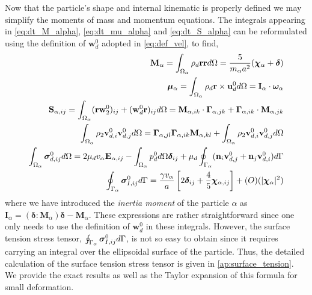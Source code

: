 Now that the particle's shape and internal kinematic is properly defined we may simplify the moments of mass and momentum equations. 
The integrals appearing in \ref{eq:dt_M_alpha}, \ref{eq:dt_mu_alpha} and \ref{eq:dt_S_alpha} can be reformulated using the definition of $\textbf{w}_d^0$ adopted in \ref{eq:def_vel}, to find, 
\begin{align}
    \textbf{M}_\alpha 
    = \intO{ \rho_d \textbf{rr} }
    = \frac{5}{m_\alpha a^2} (\bm\chi_\alpha+\bm\delta)\\
    \bm\mu_\alpha 
    = \intO{ \rho_d \textbf{r}\times\textbf{u}_d^0 }
    = \textbf{I}_\alpha \cdot \bm\omega_\alpha\\
    \textbf{S}_{\alpha,ij} = \intO{(\textbf{rw}_ 2^0 )_{ij}+ (\textbf{w}_d^0 \textbf{r})_{ij}} 
    = \textbf{M}_{\alpha,ik} \cdot \bm\Gamma_{\alpha,jk}
        +  \bm\Gamma_{\alpha,ik} \cdot \textbf{M}_{\alpha,jk}
    \\
    \intO{\rho_2 \textbf{v}_{d,i}^0\textbf{v}_{d,j}^0}
    = \bm\Gamma_{\alpha,jl}\bm\Gamma_{\alpha,ik} \textbf{M}_{\alpha,kl}  
    +\intO{\rho_2 \textbf{v}_{d,i}^0\textbf{v}_{d,j}^0}
    \label{eq:ww_def}
    \\
    \label{eq:sigma_d_def}
    \intO{\bm\sigma_{d,ij}^0}
    =
    2 \mu_d v_\alpha \textbf{E}_{\alpha,ij}
    - \intO{p_d^0} \bm\delta_{ij}
    + \mu_d \intS{(\textbf{n}_i \textbf{v}_{d,j}^0 + \textbf{n}_j \textbf{v}_{d,i}^0)}
    \\
    \intS{\bm\sigma_{I,ij}^0}
    = \frac{\gamma v_\alpha }{a} \left[
        2\bm\delta_{ij} 
        + \frac{4  }{5} \bm\chi_{\alpha,ij}
    \right]
    +\mathcal(O)(|\bm\chi_\alpha|^2)
\end{align}
where we have introduced the \textit{inertia moment} of the particle $\alpha$ as $\textbf{I}_\alpha = (\bm\delta : \textbf{M}_\alpha)\bm\delta - \textbf{M}_\alpha$. 
These expressions are rather straightforward since one only needs to use the definition of $\textbf{w}_d^0$ in these integrals. 
However, the surface tension stress tensor, $\oint_{\Gamma_{\alpha}} \bm\sigma_{I,ij}^0 d\Gamma$, is not so easy to obtain since it requires carrying an integral over the ellipsoidal surface of the particle.
Thus, the detailed calculation of the surface tension stress tensor is given in \ref{ap:surface_tension}. 
We provide the exact results as well as the Taylor expansion of this formula for small deformation. 
